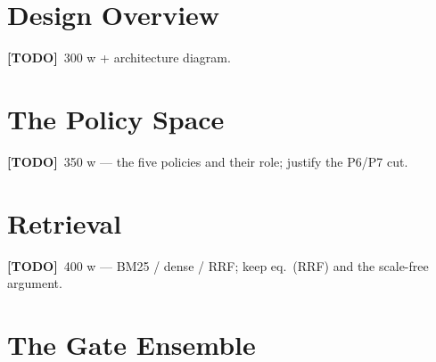 \documentclass[11pt,a4paper]{report}
\newcommand{\todo}[1]{\par\noindent\textcolor{red!70!black}{\small\textbf{[TODO]}~#1}\par}
\begin{document}
\section{Design Overview}
\label{sec:method-overview}
\todo{300 w + architecture diagram.}

\section{The Policy Space}
\label{sec:method-policies}

\todo{350 w — the five policies and their role; justify the P6/P7 cut.}

\section{Retrieval}
\label{sec:method-retrieval}
\todo{400 w — BM25 / dense / RRF; keep eq.~(RRF) and the scale-free argument.}

\section{The Gate Ensemble}
\label{sec:method-gates}
\end{document}
